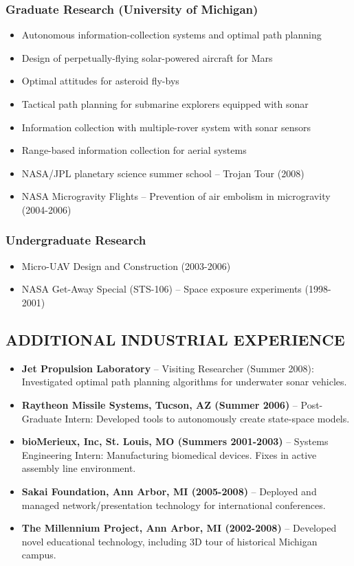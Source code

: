 \documentclass[11pt,letterpaper]{article}
\begin{document}
\subsubsection*{Graduate Research (University of Michigan)}
\begin{itemize}
\item Autonomous information-collection systems and optimal path planning
\item Design of perpetually-flying solar-powered aircraft for Mars
\item Optimal attitudes for asteroid fly-bys
\item Tactical path planning for submarine explorers equipped with sonar
\item Information collection with multiple-rover system with sonar sensors
\item Range-based information collection for aerial systems
\item NASA/JPL planetary science summer school – Trojan Tour (2008)
\item NASA Microgravity Flights – Prevention of air embolism in microgravity (2004-2006)
\end{itemize}

\subsubsection*{Undergraduate Research}
\begin{itemize}
\item Micro-UAV Design and Construction (2003-2006)
\item NASA Get-Away Special (STS-106) – Space exposure experiments (1998-2001)
\end{itemize}

\subsection*{ADDITIONAL INDUSTRIAL EXPERIENCE}
\begin{itemize}
\item \textbf{Jet Propulsion Laboratory} – Visiting Researcher (Summer 2008): Investigated optimal path planning algorithms for underwater sonar vehicles.
\item \textbf{Raytheon Missile Systems, Tucson, AZ (Summer 2006)} – Post-Graduate Intern: Developed tools to autonomously create state-space models.
\item \textbf{bioMerieux, Inc, St. Louis, MO (Summers 2001-2003)} – Systems Engineering Intern: Manufacturing biomedical devices. Fixes in active assembly line environment.
\item \textbf{Sakai Foundation, Ann Arbor, MI (2005-2008)} – Deployed and managed network/presentation technology for international conferences.
\item \textbf{The Millennium Project, Ann Arbor, MI (2002-2008)} – Developed novel educational technology, including 3D tour of historical Michigan campus.
\end{itemize}
\end{document}
